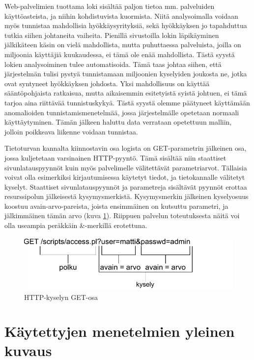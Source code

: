 Web-palvelimien tuottama loki sisältää paljon tietoa mm. palveluiden käyttöasteista, ja niihin kohdistuvista kuormista. Niitä analysoimalla voidaan myös tunnistaa mahdollisia hyökkäysyrityksiä, sekä
hyökkäyksen jo tapahduttua tutkia siihen johtaneita vaiheita. Pienillä sivustoilla lokin läpikäyminen jälkikäteen käsin on vielä mahdollista, mutta puhuttaessa palveluista, joilla on miljoonia käyttäjiä 
kuukaudessa, ei tämä ole enää mahdollista. Tästä syystä lokien analysoiminen tulee automatisoida. Tämä taas johtaa siihen, että järjestelmän tulisi pystyä tunnistamaan miljoonien kyselyiden joukosta
ne, jotka ovat syntyneet hyökkäyksen johdosta. Yksi mahdollisuus on käyttää sääntöpohjaista ratkaisua, mutta aikaisemmin esitetyistä syistä johtuen, ei tämä tarjoa aina riittävää tunnistuskykyä. Tästä 
syystä olemme päätyneet käyttämään anomalioiden tunnistamismenetelmää, jossa järjestelmälle opetetaan normaali käyttäytyminen. Tämän jälkeen haluttu data verrataan opetettuun malliin, jolloin poikkeava
liikenne voidaan tunnistaa.

Tietoturvan kannalta kiinnostavin osa logista on GET-parametrin jälkeinen osa, jossa kuljetetaan varsinainen HTTP-pyyntö. Tämä sisältää niin staattiset sivunlatauspyynnöt kuin myös palvelimelle 
välitettävät parametriarvot. Tällaisia voivat olla esimerkiksi kirjautumisessa käytetyt tiedot, ja tietokannalle välitetyt kyselyt. Staattiset sivunlatauspyynnöt ja parametreja sisältävät pyynnöt erottaa
resurssipolun jälkeisestä kysymysmerkistä. Kysymysmerkin jälkeinen kyselyosuus koostuu avain-arvo-pareista, joista ensimmäinen on kutsuttu parametri, ja jälkimmäinen tämän arvo (kuva \ref{CLF2}). Riippuen
palvelun toteutuksesta näitä voi olla useampia peräkkäin \&-merkillä erotettuna.

\begin{figure}[ht]
\centering
\includegraphics[width=13cm]{pics/logi2.pdf}
\caption{HTTP-kyselyn GET-osa}
\label{CLF2}
\end{figure}

\section{Käytettyjen menetelmien yleinen kuvaus}

